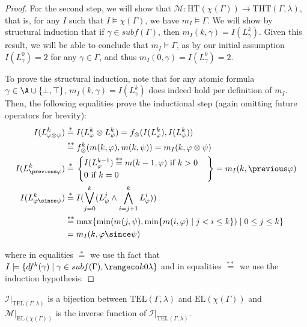 \begin{proof}
  For the second step, we will show that
  $\mathcal{M}: \text{HT}(\chi(\Gamma)) \rightarrow
  \text{THT}(\Gamma,\lambda)$, that is, for any $I$ such that
  $I \models \chi(\Gamma)$, we have $m_I \models \Gamma$. We will show
  by structural induction that if $\gamma \in subf(\Gamma)$, then
  $m_I(k,\gamma) = I(L^k_\gamma)$.  Given this result, we will be able
  to conclude that $m_I \models \Gamma$, as by our initial assumption
  $I(L^0_\gamma)=2$ for any $\gamma \in \Gamma$, and thus
  $m_I(0,\gamma)=I(L^0_\gamma)=2$.

  To prove the structural induction, note that for any atomic formula
  $\gamma \in \A \cup \{ \bot, \top \}$,
  $m_I(k,\gamma) = I(L^k_\gamma)$ does indeed hold per definition of
  $m_I$. Then, the following equalities prove the inductional step
  (again omitting future operators for brevity):
  \begin{align*}
  I(L^k_{\varphi \otimes \psi}) &\stackrel{*}{=} I(L^k_{\varphi} \otimes L^k_{\psi})
  =  f_{\otimes}(I(L^k_\varphi),I(L^k_\psi))\\
  &\stackrel{**}{=} f_{\otimes}^k(m(k,\varphi),m(k,\psi)) =  m_I(k,\varphi \otimes \psi)\\
  I(L^k_{\previous \varphi}) &\stackrel{*}{=} \left. \begin{cases}
    I(L^{k-1}_\varphi)  \stackrel{**}{=} m(k-1,\varphi) \text{ if } k > 0\\
    0 \text{ if } k = 0
    \end{cases} \right\} = m_I(k,\previous \varphi)\\
  I(L^k_{\varphi \since \psi}) 
    & \stackrel{*}{=}  I(\bigvee_{j=0}^{k}(L_\psi^j \wedge \bigwedge_{i=j+1}^{k}L_{\varphi}^i)) \\
    & \stackrel{**}{=} \max \{\min (m(j, \psi), \min \{m(i, \varphi) \mid j<i \leq k\}) \mid 0 \leq j \leq k\} \\
    & =  m_I(k,\varphi \since \psi)
  \end{align*}

  where in equalities $\stackrel{*}{=}$ we use th fact that $I \models
  \{ df^k(\gamma) \mid \gamma \in subf(\Gamma), \kinlambda
  \}$ and in equalities
  $\stackrel{**}{=}$ we use the induction hypothesis.
\end{proof}

\begin{corollary}\label{cor:bijection-of-sm}
  $\mathcal{I}\vert_{\text{TEL}(\Gamma,\lambda)}$ is a bijection
  between $\text{TEL}(\Gamma,\lambda)$ and $\text{EL}(\chi(\Gamma))$
  and $\mathcal{M}\vert_{\text{EL}(\chi(\Gamma))}$ is the inverse
  function of $\mathcal{I}\vert_{\text{TEL}(\Gamma,\lambda)}$.
\end{corollary}

